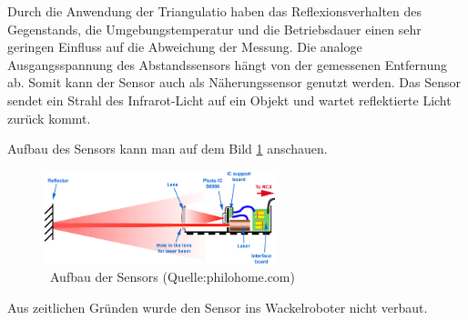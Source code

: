 Durch die Anwendung der Triangulatio haben das Reflexionsverhalten des Gegenstands, die Umgebungstemperatur und die Betriebsdauer einen sehr geringen Einfluss auf die Abweichung der Messung. Die analoge Ausgangsspannung des Abstandssensors hängt von der gemessenen Entfernung ab. Somit kann der Sensor auch als Näherungssensor genutzt werden.
Das Sensor sendet ein Strahl des Infrarot-Licht auf ein Objekt und wartet  reflektierte Licht zurück kommt. 
 
Aufbau des Sensors kann man auf dem Bild \ref{laser-sensor1} anschauen.

\begin{figure}[!h]  %
	\centering\includegraphics[width=0.6\textwidth]{images/laser-sensor1.png}
	\caption{ \ Aufbau der Sensors (Quelle:philohome.com)}
	\label{laser-sensor1} %
\end{figure}


Aus zeitlichen Gründen wurde den Sensor ins Wackelroboter nicht verbaut.
